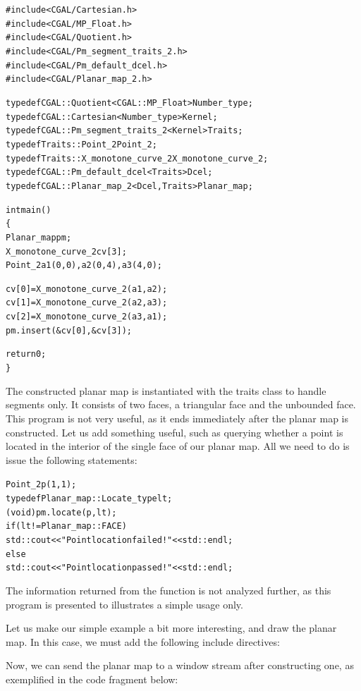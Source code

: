 \begin{alltt}
#include <CGAL/Cartesian.h>
#include <CGAL/MP_Float.h>
#include <CGAL/Quotient.h>
#include <CGAL/Pm_segment_traits_2.h>
#include <CGAL/Pm_default_dcel.h>
#include <CGAL/Planar_map_2.h>

typedef CGAL::Quotient<CGAL::MP_Float>    Number_type;
typedef CGAL::Cartesian<Number_type>      Kernel;
typedef CGAL::Pm_segment_traits_2<Kernel> Traits;
typedef Traits::Point_2                   Point_2;
typedef Traits::X_monotone_curve_2        X_monotone_curve_2;
typedef CGAL::Pm_default_dcel<Traits>     Dcel;
typedef CGAL::Planar_map_2<Dcel,Traits>   Planar_map;

int main()
\{
  Planar_map pm;
  X_monotone_curve_2 cv[3];
  Point_2 a1(0,0), a2(0,4), a3(4,0);
 
  cv[0] = X_monotone_curve_2(a1,a2);
  cv[1] = X_monotone_curve_2(a2,a3);
  cv[2] = X_monotone_curve_2(a3,a1);
  pm.insert(&cv[0], &cv[3]);

  return 0;
\}
\end{alltt}

The constructed planar map is instantiated with the
 traits class to handle segments only. It
consists of two faces, a triangular face and the unbounded face.
This program is not very useful, as it ends immediately after the
planar map is constructed. Let us add something useful, such as
querying whether a point is located in the interior of the single
face of our planar map. All we need to do is issue the following
statements:

\begin{alltt}
  Point_2 p(1,1);
  typedef Planar_map::Locate_type lt;
  (void) pm.locate(p, lt);
  if (lt != Planar_map::FACE)
    std::cout << "Point location failed!" << std::endl;
  else
    std::cout << "Point location passed!" << std::endl;
\end{alltt}

The information returned from the  function is
not analyzed further, as this program is presented to illustrates a
simple usage only.

Let us make our simple example a bit more interesting, and draw
the planar map. In this case, we must add the following include
directives:


Now, we can send the planar map to a window stream after constructing
one, as exemplified in the code fragment below:

